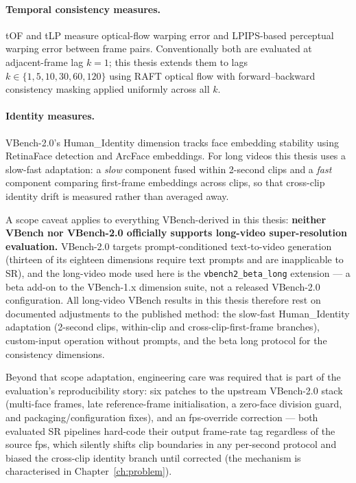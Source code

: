 \paragraph{Temporal consistency measures.} tOF and tLP \cite{chu_tecogan_2020} measure
optical-flow warping error and LPIPS-based perceptual warping error between frame pairs.
Conventionally both are evaluated at adjacent-frame lag $k{=}1$; this thesis extends them
to lags $k \in \{1, 5, 10, 30, 60, 120\}$ using RAFT \cite{teed_raft_2020} optical flow
with forward--backward consistency masking applied uniformly across all $k$.

\paragraph{Identity measures.} VBench-2.0's Human\_Identity dimension tracks face
embedding stability using RetinaFace \cite{deng_retinaface_2020} detection and ArcFace
\cite{deng_arcface_2019} embeddings. For long videos this thesis uses a slow-fast
adaptation: a \emph{slow} component fused within 2-second clips and a \emph{fast}
component comparing first-frame embeddings across clips, so that cross-clip identity
drift is measured rather than averaged away.

A scope caveat applies to everything VBench-derived in this thesis:
\textbf{neither VBench nor VBench-2.0 officially supports long-video
super-resolution evaluation.} VBench-2.0 targets prompt-conditioned
text-to-video generation (thirteen of its eighteen dimensions require text
prompts and are inapplicable to SR), and the long-video mode used here is the
\texttt{vbench2\_beta\_long} extension --- a beta add-on to the VBench-1.x
dimension suite, not a released VBench-2.0 configuration. All long-video
VBench results in this thesis therefore rest on documented adjustments to the
published method: the slow-fast Human\_Identity adaptation
(2-second clips, within-clip and cross-clip-first-frame branches), custom-input
operation without prompts, and the beta long protocol for the consistency
dimensions.

Beyond that scope adaptation, engineering care was required that is part of
the evaluation's reproducibility story: six patches to the upstream
VBench-2.0 stack (multi-face frames, late reference-frame initialisation, a
zero-face division guard, and packaging/configuration fixes), and an
fps-override correction --- both evaluated SR pipelines hard-code their output
frame-rate tag regardless of the source fps, which silently shifts clip
boundaries in any per-second protocol and biased the cross-clip identity branch
until corrected (the mechanism is characterised in
Chapter~\ref{ch:problem}).

